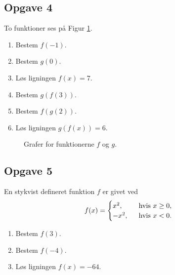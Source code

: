 \subsection*{Opgave 4}

\begin{minipage}{0.49\textwidth}
To funktioner ses på Figur \ref{fig:sammensat}. 
\begin{enumerate}[label=\roman*)]
	\item Bestem $f(-1)$.
	\item Bestem $g(0)$.
	\item Løs ligningen $f(x) = 7$.
	\item Bestem $g(f(3))$.
	\item Bestem $f(g(2))$.
	\item Løs ligningen $g(f(x)) = 6$. 
\end{enumerate}
\vspace{4cm}

\end{minipage}
\begin{minipage}{0.5\textwidth}
\begin{figure}[H]
	\centering
	\caption{Grafer for funktionerne $f$ og $g$.}
	\label{fig:sammensat}
\end{figure}
\end{minipage}



\subsection*{Opgave 5}
En stykvist defineret funktion $f$ er givet ved
\begin{align*}
	f(x) = 
	\begin{cases}
		x^2, \ &\textnormal{ hvis } x \geq 0,\\
		-x^2, \ &\textnormal{ hvis } x < 0.
	\end{cases}
\end{align*}
\begin{enumerate}[label=\roman*)]
	\item Bestem $f(3).$
	\item Bestem $f(-4).$
	\item Løs ligningen $f(x) = -64$.
\end{enumerate}

